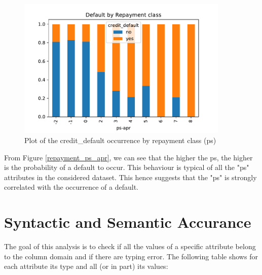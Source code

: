 \documentclass[a4paper]{article}
\begin{document}
\begin{center}
\begin{figure}
\includegraphics[width=0.9\textwidth]{../Code/Daniele/Plots/credit_default_ps_apr.pdf}
\caption{Plot of the credit\_default occurrence by repayment class (ps)}
\label{fig:repayment_ps_apr}
\end{figure}
\end{center}


From Figure \ref{repayment_ps_apr}, we can see that the higher the ps, the higher is the probability of a default to occur. This behaviour is typical of all the "ps" attributes in the considered dataset. This hence suggests that the "ps" is strongly correlated with the occurrence of a default. 

\section{Syntactic and Semantic Accurance}
The goal of this analysis is to check if all the values of a specific attribute belong to the column domain and if there are typing error.
The following table shows for each attribute its type and all (or in part) its values:
\end{document}
